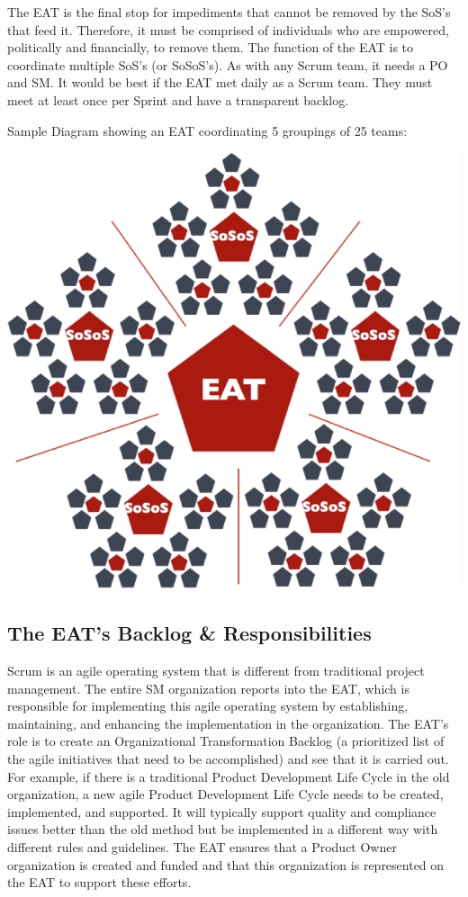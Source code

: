 \documentclass[12pt,a4paper,parskip=full]{scrartcl}
\begin{document}
The EAT is the final stop for
impediments that cannot be removed by the SoS's that feed it. Therefore, it
must be comprised of individuals who are empowered, politically and
financially, to remove them. 
The function of the EAT is to coordinate
multiple SoS's (or SoSoS's). As with any Scrum team, it needs a PO and SM.
It would be best if the EAT met daily as a Scrum team. They must meet at
least once per Sprint and have a transparent backlog.

Sample Diagram showing an EAT coordinating 5 groupings of 25 teams:

\includegraphics[width=\textwidth,height=\textheight,keepaspectratio]{SoS-EAT.png}

\subsection{The EAT's Backlog \& Responsibilities}
Scrum is an agile operating system that is different from traditional
project management. The entire SM organization reports into the EAT, which
is responsible for implementing this agile operating system by
establishing, maintaining, and enhancing the implementation in the
organization.
The EAT's role is to create an Organizational Transformation Backlog (a
prioritized list of the agile initiatives that need to be accomplished) and
see that it is carried out. For example, if there is a traditional Product
Development Life Cycle in the old organization, a new agile Product
Development Life Cycle needs to be created, implemented, and supported. It
will typically support quality and compliance issues better than the old
method but be implemented in a different way with different rules and
guidelines. The EAT ensures that a Product Owner organization is created and funded
and that this organization is represented on the EAT to support these efforts.
\end{document}
